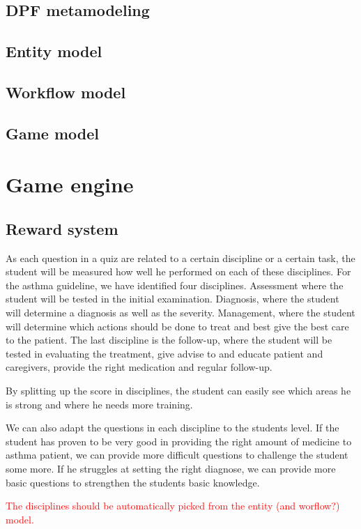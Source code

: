 \documentclass[a4paper,12pt]{book}
\begin{document}
\subsection{DPF metamodeling}
\subsection{Entity model}
\subsection{Workflow model}
\subsection{Game model}
\section{Game engine}
\subsection{Reward system}
As each question in a quiz are related to a certain discipline or a certain task, the student will be measured how well he performed on each of these disciplines. For the asthma guideline, we have identified four disciplines. Assessment where the student will be tested in the initial examination. Diagnosis, where the student will determine a diagnosis as well as the severity. Management, where the student will determine which actions should be done to treat and best give the best care to the patient. The last discipline is the follow-up, where the student will be tested in evaluating the treatment, give advise to and educate patient and caregivers, provide the right medication and regular follow-up.

By splitting up the score in disciplines, the student can easily see which areas he is strong and where he needs more training. 



 We can also adapt the questions in each discipline to the students level. If the student has proven to be very good in providing the right amount of medicine to asthma patient, we can provide more difficult questions to challenge the student some more. If he struggles at setting the right diagnose, we can provide more basic questions to strengthen the students basic knowledge. 

\textcolor{red}{The disciplines should be automatically picked from the entity (and worflow?) model.}
\end{document}
